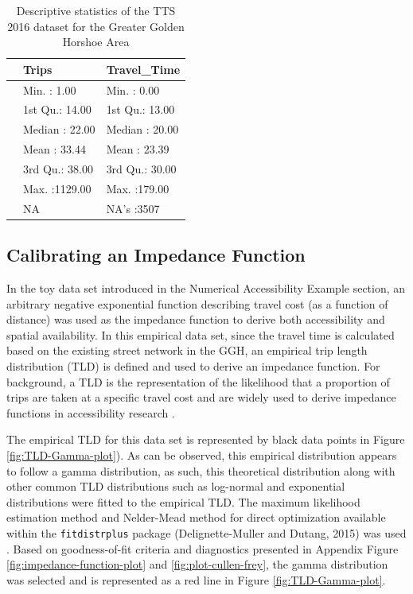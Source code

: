 \documentclass[]{elsarticle} %
\begin{document}
\begin{table}

\caption{\label{tab:unnamed-chunk-1}\label{tab:TTS-16-desc-stats}Descriptive statistics of the TTS 2016 dataset for the Greater Golden Horshoe Area}
\centering
\begin{tabular}[t]{l|l|l}
\hline
  & Trips & Travel\_Time\\
\hline
 & Min.   :   1.00 & Min.   :  0.00\\
\hline
 & 1st Qu.:  14.00 & 1st Qu.: 13.00\\
\hline
 & Median :  22.00 & Median : 20.00\\
\hline
 & Mean   :  33.44 & Mean   : 23.39\\
\hline
 & 3rd Qu.:  38.00 & 3rd Qu.: 30.00\\
\hline
 & Max.   :1129.00 & Max.   :179.00\\
\hline
 & NA & NA's   :3507\\
\hline
\end{tabular}
\end{table}

\hypertarget{calibrating-an-impedance-function}{%
\subsection{Calibrating an Impedance
Function}\label{calibrating-an-impedance-function}}

In the toy data set introduced in the
\protect\hypertarget{accessibility-numerical-example}{}{Numerical
Accessibility Example} section, an arbitrary negative exponential
function describing travel cost (as a function of distance) was used as
the impedance function to derive both accessibility and spatial
availability. In this empirical data set, since the travel time is
calculated based on the existing street network in the GGH, an empirical
trip length distribution (TLD) is defined and used to derive an
impedance function. For background, a TLD is the representation of the
likelihood that a proportion of trips are taken at a specific travel
cost and are widely used to derive impedance functions in accessibility
research .

The empirical TLD for this data set is represented by black data points
in Figure \ref{fig:TLD-Gamma-plot}). As can be observed, this empirical
distribution appears to follow a gamma distribution, as such, this
theoretical distribution along with other common TLD distributions such
as log-normal and exponential distributions were fitted to the empirical
TLD. The maximum likelihood estimation method and Nelder-Mead method for
direct optimization available within the \texttt{fitdistrplus} package
(Delignette-Muller and Dutang, 2015) was used . Based on goodness-of-fit
criteria and diagnostics presented in Appendix Figure
\ref{fig:impedance-function-plot} and \ref{fig:plot-cullen-frey}, the
gamma distribution was selected and is represented as a red line in
Figure \ref{fig:TLD-Gamma-plot}.
\end{document}
